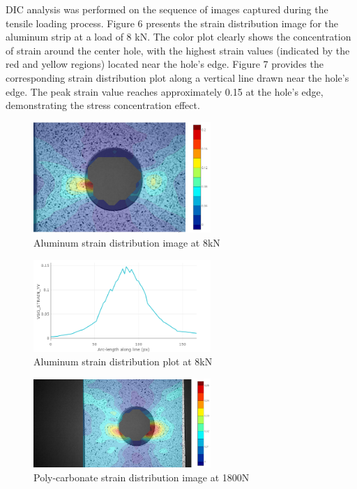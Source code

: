 \documentclass{article}
\begin{document}
DIC analysis was performed on the sequence of images captured during the tensile loading process. Figure 6 presents the strain distribution image for the aluminum strip at a load of 8 kN. The color plot clearly shows the concentration of strain around the center hole, with the highest strain values (indicated by the red and yellow regions) located near the hole's edge. Figure 7 provides the corresponding strain distribution plot along a vertical line drawn near the hole's edge. The peak strain value reaches approximately 0.15 at the hole's edge, demonstrating the stress concentration effect.

\begin{figure}[H]
    \centering
    \includegraphics[width = 0.6\textwidth]{lab9images/meow color plot aluminum.PNG}
    \caption{Aluminum strain distribution image at 8kN}
    \label{fig:al8kNpic}
\end{figure}



\begin{figure}[H]
    \centering
    \includegraphics[width = 0.6\textwidth]{lab9images/8kNplot_Al_strainyy.png}
    \caption{Aluminum strain distribution plot at 8kN}
    \label{fig:al8kNplot}
\end{figure}



\begin{figure}[H]
    \centering
    \includegraphics[width = 0.6\textwidth]{lab9images/1800Npccolored_strainyy.PNG}
    \caption{Poly-carbonate strain distribution image at 1800N}
    \label{fig:PC1800Npic}
\end{figure}
\end{document}
